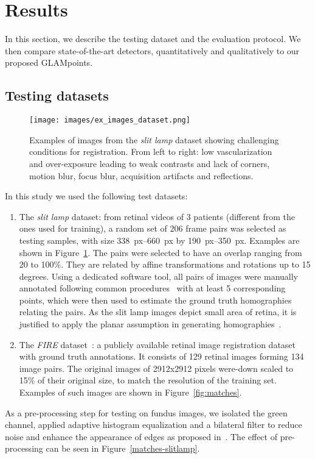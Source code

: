 \section{Results}
\label{sec:results}

In this section, we describe the testing dataset and the evaluation protocol. We then compare state-of-the-art detectors, quantitatively and qualitatively to our proposed \ac{GLAMpoints}.

\subsection{Testing datasets}

\begin{figure}[t]
\centering
\texttt{[image: images/ex\_images\_dataset.png]}
\vspace{-2mm}\caption{Examples of images from the \textit{slit lamp} dataset showing challenging conditions for registration. From left to right: low vascularization and over-exposure leading to weak contrasts and lack of corners, motion blur, focus blur, acquisition artifacts and reflections.}
\label{fig:ex_dataset}
\vspace{-2mm}
\end{figure}

In this study we used the following test datasets:
\begin{enumerate}
\item The \textit{slit lamp} dataset: from retinal videos of 3 patients (different from the ones used for training), a random set of 206 frame pairs was selected as testing samples, with size \SIrange{338}{660}{px} by \SIrange{190}{350}{px}. Examples are shown in Figure~\ref{fig:ex_dataset}. The pairs were selected to have an overlap ranging from 20 to 100\%. They are related by affine transformations and rotations up to 15 degrees. 
Using a dedicated software tool, all pairs of images were manually annotated following common procedures~\cite{chen} with at least 5 corresponding points, which were then used to estimate the ground truth homographies relating the pairs. As the slit lamp images depict small area of retina, it is justified to apply the planar assumption in generating homographies~\cite{Cattin,giancardo}.

\item The \textit{\ac{FIRE}} dataset~\cite{Hernandez-matas2017}: a publicly available retinal image registration dataset with ground truth annotations. It consists of 129 retinal images forming 134 image pairs. The original images of 2912x2912 pixels were-down scaled to 15\% of their original size, to match the resolution of the training set. Examples of such images are shown in Figure~\ref{fig:matches}.
\end{enumerate}
As a pre-processing step for testing on fundus images, we isolated the green channel, applied adaptive histogram equalization and a bilateral filter to reduce noise and enhance the appearance of edges as proposed in~\cite{Zanet}. The effect of pre-processing can be seen in Figure~\ref{matches-slitlamp}.


